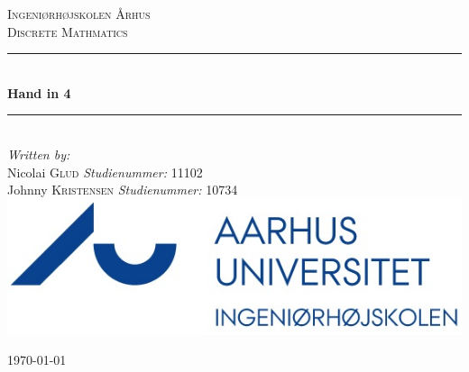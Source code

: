 \newcommand{\HRule}{\rule{\linewidth}{0.5mm}} %

\begin{center} %
 

\textsc{\LARGE Ingeniørhøjskolen Århus}\\[1.5cm] %
\textsc{\large Discrete Mathmatics}\\[0.5cm] %


\HRule \\[0.4cm]
{ \huge \bfseries Hand in 4}\\[0.4cm] %
\HRule \\[1.5cm]
 

\Large \emph{Written by:}\\
Nicolai \textsc{Glud} \textit{Studienummer:} 11102\\
Johnny \textsc{Kristensen} \textit{Studienummer:} 10734\\



\includegraphics[scale=2]{billeder/iha-logo}\\ %
 

\vfill %

{\large \today}\\[3cm] %
\end{center}
